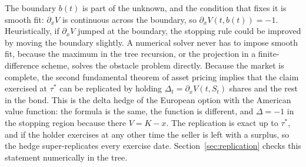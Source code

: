 The boundary $b(t)$ is part of the unknown, and the condition that fixes it is smooth fit: $\partial_xV$ is continuous across the boundary, so $\partial_xV(t,b(t))=-1$.
Heuristically, if $\partial_xV$ jumped at the boundary, the stopping rule could be improved by moving the boundary slightly.
A numerical solver never has to impose smooth fit, because the maximum in the tree recursion, or the projection in a finite-difference scheme, solves the obstacle problem directly.
Because the market is complete, the second fundamental theorem of asset pricing implies that the claim exercised at $\tau^*$ can be replicated by holding $\Delta_t=\partial_xV(t,S_t)$ shares and the rest in the bond.
This is the delta hedge of the European option with the American value function: the formula is the same, the function is different, and $\Delta=-1$ in the stopping region because there $V=K-x$.
The replication is exact up to $\tau^*$, and if the holder exercises at any other time the seller is left with a surplus, so the hedge super-replicates every exercise date.
Section~\ref{sec:replication} checks this statement numerically in the tree.
